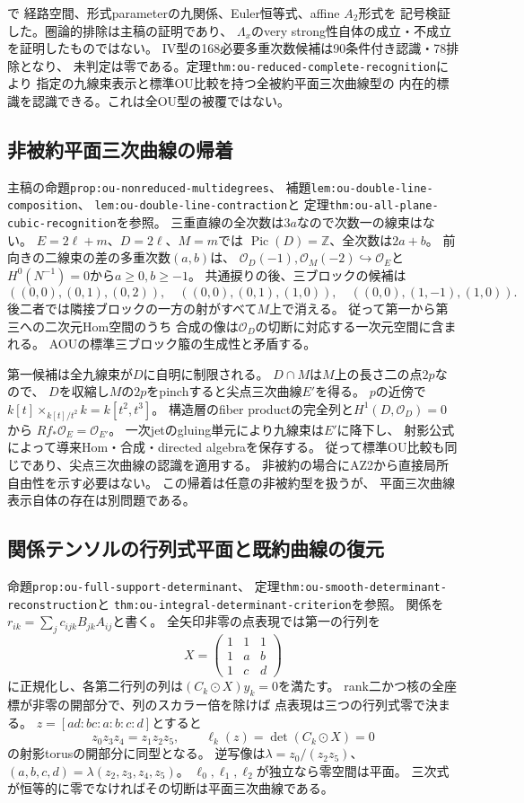 \documentclass[11pt,a4paper]{ltjsarticle}
\newcommand{\Pic}{\operatorname{Pic}}
\begin{document}
で
経路空間、形式parameterの九関係、Euler恒等式、affine $A_2$形式を
記号検証した。圏論的排除は主稿の証明であり、
$\Lambda_x$のvery strong性自体の成立・不成立を証明したものではない。
IV型の168必要多重次数候補は90条件付き認識・78排除となり、
未判定は零である。定理\texttt{thm:ou-reduced-complete-recognition}により
指定の九線束表示と標準OU比較を持つ全被約平面三次曲線型の
内在的標識を認識できる。これは全OU型の被覆ではない。

\subsection*{非被約平面三次曲線の帰着}
主稿の命題\texttt{prop:ou-nonreduced-multidegrees}、
補題\texttt{lem:ou-double-line-composition}、
\texttt{lem:ou-double-line-contraction}と
定理\texttt{thm:ou-all-plane-cubic-recognition}を参照。
三重直線の全次数は$3a$なので次数一の線束はない。
$E=2\ell+m$、$D=2\ell$、$M=m$では
$\Pic(D)=\mathbb Z$、全次数は$2a+b$。
前向きの二線束の差の多重次数$(a,b)$は、
$\mathcal O_D(-1),\mathcal O_M(-2)\hookrightarrow\mathcal O_E$と
$H^0(N^{-1})=0$から$a\geq0,b\geq-1$。
共通捩りの後、三ブロックの候補は
\[
 ((0,0),(0,1),(0,2)),\quad
 ((0,0),(0,1),(1,0)),\quad
 ((0,0),(1,-1),(1,0)).
\]
後二者では隣接ブロックの一方の射がすべて$M$上で消える。
従って第一から第三への二次元Hom空間のうち
合成の像は$\mathcal O_D$の切断に対応する一次元空間に含まれる。
AOUの標準三ブロック箙の生成性と矛盾する。

第一候補は全九線束が$D$に自明に制限される。
$D\cap M$は$M$上の長さ二の点$2p$なので、
$D$を収縮し$M$の$2p$をpinchすると尖点三次曲線$E'$を得る。
$p$の近傍で$k[t]\times_{k[t]/t^2} k=k[t^2,t^3]$。
構造層のfiber productの完全列と$H^1(D,\mathcal O_D)=0$から
$Rf_*\mathcal O_E=\mathcal O_{E'}$。
一次jetのgluing単元により九線束は$E'$に降下し、
射影公式によって導来Hom・合成・directed algebraを保存する。
従って標準OU比較も同じであり、尖点三次曲線の認識を適用する。
非被約の場合にAZ2から直接局所自由性を示す必要はない。
この帰着は任意の非被約型を扱うが、
平面三次曲線表示自体の存在は別問題である。

\subsection*{関係テンソルの行列式平面と既約曲線の復元}
命題\texttt{prop:ou-full-support-determinant}、
定理\texttt{thm:ou-smooth-determinant-reconstruction}と
\texttt{thm:ou-integral-determinant-criterion}を参照。
関係を$r_{ik}=\sum_j c_{ijk}B_{jk}A_{ij}$と書く。
全矢印非零の点表現では第一の行列を
\[
 X=\begin{pmatrix}1&1&1\\1&a&b\\1&c&d\end{pmatrix}
\]
に正規化し、各第二行列の列は$(C_k\odot X)y_k=0$を満たす。
rank二かつ核の全座標が非零の開部分で、列のスカラー倍を除けば
点表現は三つの行列式零で決まる。
$z=[ad:bc:a:b:c:d]$とすると
\[
 z_0z_3z_4=z_1z_2z_5,\qquad
 \ell_k(z)=\det(C_k\odot X)=0
\]
の射影torusの開部分に同型となる。
逆写像は$\lambda=z_0/(z_2z_5)$、
$(a,b,c,d)=\lambda(z_2,z_3,z_4,z_5)$。
$\ell_0,\ell_1,\ell_2$が独立なら零空間は平面。
三次式が恒等的に零でなければその切断は平面三次曲線である。
\end{document}
